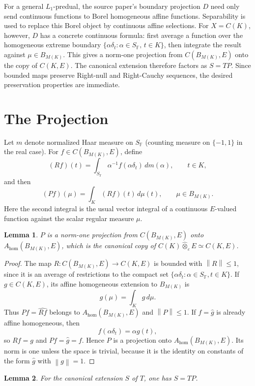 \documentclass[11pt]{article}
\newtheorem{lemma}{Lemma}
\newcommand{\ot}{\widehat{\otimes}_{\varepsilon}}
\newcommand{\BM}{B_{M(K)}}
\newcommand{\SF}{S_{\mathbb F}}
\newcommand{\norm}[1]{\left\|#1\right\|}
\newcommand{\Ahom}{A_{\mathrm{hom}}}
\begin{document}
For a general \(L_1\)-predual, the source paper's boundary projection \(D\)
need only send continuous functions to Borel homogeneous affine functions.
Separability is used to replace this Borel object by continuous affine
selections.  For \(X=C(K)\), however, \(D\) has a concrete continuous formula:
first average a function over the homogeneous extreme boundary
\(\{\alpha\delta_t:\alpha\in S_{\mathbb F},\,t\in K\}\), then integrate the
result against \(\mu\in B_{M(K)}\).  This gives a norm-one projection from
\(C(B_{M(K)},E)\) onto the copy of \(C(K,E)\).  The canonical extension
therefore factors as \(S=T P\).  Since bounded maps preserve Right-null and
Right-Cauchy sequences, the desired preservation properties are immediate.

\section*{The Projection}

Let \(m\) denote normalized Haar measure on \(\SF\) (counting measure on
\(\{-1,1\}\) in the real case).  For
\(f\in C(\BM,E)\), define
\[
  (Rf)(t)=\int_{\SF}\alpha^{-1}f(\alpha\delta_t)\,dm(\alpha),
  \qquad t\in K,
\]
and then
\[
  (Pf)(\mu)=\int_K (Rf)(t)\,d\mu(t),
  \qquad \mu\in \BM.
\]
Here the second integral is the usual vector integral of a continuous
\(E\)-valued function against the scalar regular measure \(\mu\).

\begin{lemma}
\label{lem:projection}
\(P\) is a norm-one projection from \(C(\BM,E)\) onto
\(\Ahom(\BM,E)\), which is the canonical copy of \(C(K)\ot E\simeq C(K,E)\).
\end{lemma}

\begin{proof}
The map \(R:C(\BM,E)\to C(K,E)\) is bounded with \(\norm R\le 1\), since it is
an average of restrictions to the compact set
\(\{\alpha\delta_t:\alpha\in\SF,t\in K\}\).  If \(g\in C(K,E)\), its affine
homogeneous extension to \(\BM\) is
\[
  \widehat g(\mu)=\int_K g\,d\mu .
\]
Thus \(P f=\widehat{Rf}\) belongs to \(\Ahom(\BM,E)\) and \(\norm P\le 1\).
If \(f=\widehat g\) is already affine homogeneous, then
\[
  f(\alpha\delta_t)=\alpha g(t),
\]
so \(Rf=g\) and \(Pf=\widehat g=f\).  Hence \(P\) is a projection onto
\(\Ahom(\BM,E)\).  Its norm is one unless the space is trivial, because it is
the identity on constants of the form \(\widehat g\) with \(\norm g=1\).
\end{proof}

\begin{lemma}
\label{lem:factor}
For the canonical extension \(S\) of \(T\), one has \(S=T P\).
\end{lemma}
\end{document}
